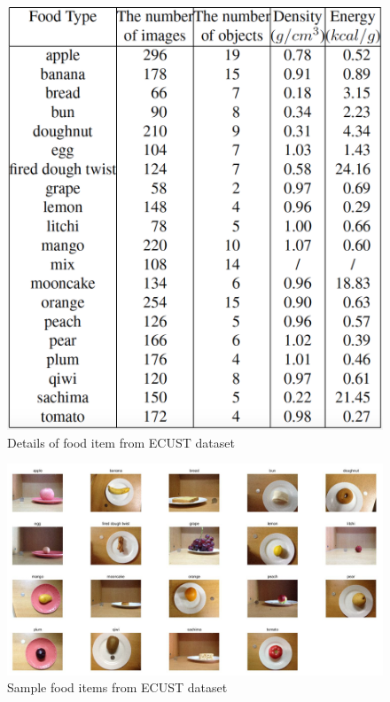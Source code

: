 \documentclass[12pt, a4paper, twoside]{article}
\begin{document}
\begin{figure}[p]
	\centering
	\includegraphics[width=\textwidth]{table}
	\caption{Details of food item from ECUST dataset}
	\label{F:table}
\end{figure}
\begin{figure}[p]
	\centering
	\includegraphics[width=\textwidth]{sample}
	\caption{Sample food items from ECUST dataset}
	\label{F:sample}
\end{figure}
\end{document}
